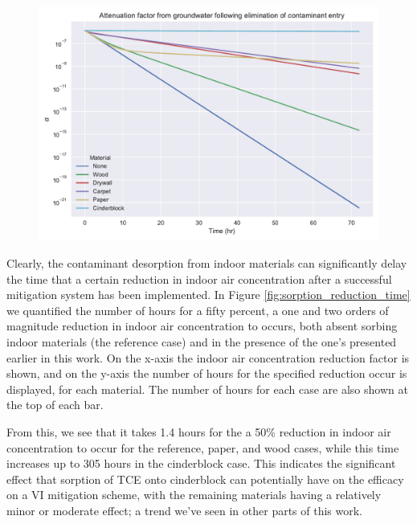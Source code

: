 \begin{figure}[!htb]
  \includegraphics[width=\textwidth]{sorption_mitigation.pdf}
  \caption{}
  \label{fig:sorption_mitigation}
\end{figure}

Clearly, the contaminant desorption from indoor materials can significantly delay the time that a certain reduction in indoor air concentration after a successful mitigation system has been implemented.
In Figure \ref{fig:sorption_reduction_time} we quantified the number of hours for a fifty percent, a one and two orders of magnitude reduction in indoor air concentration to occurs, both absent sorbing indoor materials (the reference case) and in the presence of the one's presented earlier in this work.
On the x-axis the indoor air concentration reduction factor is shown, and on the y-axis the number of hours for the specified reduction occur is displayed, for each material.
The number of hours for each case are also shown at the top of each bar.\par

From this, we see that it takes 1.4 hours for the a 50\% reduction in indoor air concentration to occur for the reference, paper, and wood cases, while this time increases up to 305 hours in the cinderblock case.
This indicates the significant effect that sorption of TCE onto cinderblock can potentially have on the efficacy on a VI mitigation scheme, with the remaining materials having a relatively minor or moderate effect; a trend we've seen in other parts of this work.

